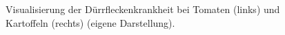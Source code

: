 \begin{figure}[t!]
	\hfill
	\hfill
	\hfill
	\caption{Visualisierung der Dürrfleckenkrankheit bei Tomaten (links) und Kartoffeln (rechts) (eigene Darstellung).
	}
	\label{eval_pot_early}
\end{figure}

